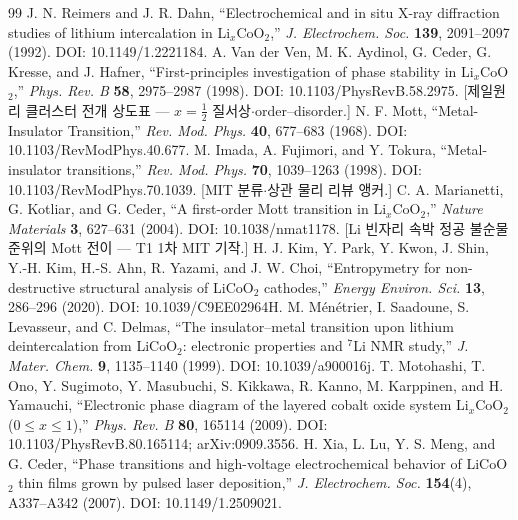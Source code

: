 \begin{thebibliography}{99}
 J. N. Reimers and J. R. Dahn, ``Electrochemical and in situ X-ray diffraction studies of lithium intercalation in Li$_x$CoO$_2$,'' \emph{J. Electrochem. Soc.} \textbf{139}, 2091--2097 (1992). DOI: 10.1149/1.2221184.
 A. Van der Ven, M. K. Aydinol, G. Ceder, G. Kresse, and J. Hafner, ``First-principles investigation of phase stability in Li$_x$CoO$_2$,'' \emph{Phys. Rev. B} \textbf{58}, 2975--2987 (1998). DOI: 10.1103/PhysRevB.58.2975. [제일원리 클러스터 전개 상도표 --- $x{=}\tfrac12$ 질서상$\cdot$order--disorder.]
 N. F. Mott, ``Metal-Insulator Transition,'' \emph{Rev. Mod. Phys.} \textbf{40}, 677--683 (1968). DOI: 10.1103/RevModPhys.40.677.
 M. Imada, A. Fujimori, and Y. Tokura, ``Metal-insulator transitions,'' \emph{Rev. Mod. Phys.} \textbf{70}, 1039--1263 (1998). DOI: 10.1103/RevModPhys.70.1039. [MIT 분류$\cdot$상관 물리 리뷰 앵커.]
 C. A. Marianetti, G. Kotliar, and G. Ceder, ``A first-order Mott transition in Li$_x$CoO$_2$,'' \emph{Nature Materials} \textbf{3}, 627--631 (2004). DOI: 10.1038/nmat1178. [Li 빈자리 속박 정공 불순물 준위의 Mott 전이 --- T1 1차 MIT 기작.]
 H. J. Kim, Y. Park, Y. Kwon, J. Shin, Y.-H. Kim, H.-S. Ahn, R. Yazami, and J. W. Choi, ``Entropymetry for non-destructive structural analysis of LiCoO$_2$ cathodes,'' \emph{Energy Environ. Sci.} \textbf{13}, 286--296 (2020). DOI: 10.1039/C9EE02964H.
 M. M\'en\'etrier, I. Saadoune, S. Levasseur, and C. Delmas, ``The insulator--metal transition upon lithium deintercalation from LiCoO$_2$: electronic properties and $^7$Li NMR study,'' \emph{J. Mater. Chem.} \textbf{9}, 1135--1140 (1999). DOI: 10.1039/a900016j.
 T. Motohashi, T. Ono, Y. Sugimoto, Y. Masubuchi, S. Kikkawa, R. Kanno, M. Karppinen, and H. Yamauchi, ``Electronic phase diagram of the layered cobalt oxide system Li$_x$CoO$_2$ ($0\le x\le1$),'' \emph{Phys. Rev. B} \textbf{80}, 165114 (2009). DOI: 10.1103/PhysRevB.80.165114; arXiv:0909.3556.
 H. Xia, L. Lu, Y. S. Meng, and G. Ceder, ``Phase transitions and high-voltage electrochemical behavior of LiCoO$_2$ thin films grown by pulsed laser deposition,'' \emph{J. Electrochem. Soc.} \textbf{154}(4), A337--A342 (2007). DOI: 10.1149/1.2509021.

\end{thebibliography}

